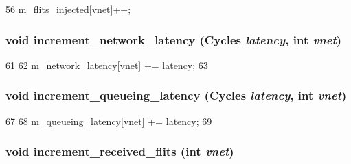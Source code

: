 \begin{DoxyCode}
56 { m_flits_injected[vnet]++; }
\end{DoxyCode}
\hypertarget{classBaseGarnetNetwork_a5fce9a1760010c8fdd6f09dea941b8ee}{
\subsubsection[{increment\_\-network\_\-latency}]{\setlength{\rightskip}{0pt plus 5cm}void increment\_\-network\_\-latency ({\bf Cycles} {\em latency}, \/  int {\em vnet})}}
\label{classBaseGarnetNetwork_a5fce9a1760010c8fdd6f09dea941b8ee}



\begin{DoxyCode}
61     {
62         m_network_latency[vnet] += latency;
63     }
\end{DoxyCode}
\hypertarget{classBaseGarnetNetwork_a9ecb65d46da0a615d77f2cbffe203304}{
\subsubsection[{increment\_\-queueing\_\-latency}]{\setlength{\rightskip}{0pt plus 5cm}void increment\_\-queueing\_\-latency ({\bf Cycles} {\em latency}, \/  int {\em vnet})}}
\label{classBaseGarnetNetwork_a9ecb65d46da0a615d77f2cbffe203304}



\begin{DoxyCode}
67     {
68         m_queueing_latency[vnet] += latency;
69     }
\end{DoxyCode}
\hypertarget{classBaseGarnetNetwork_a2afd334f1237424acf847d5ddb7a2a95}{
\subsubsection[{increment\_\-received\_\-flits}]{\setlength{\rightskip}{0pt plus 5cm}void increment\_\-received\_\-flits (int {\em vnet})}}
\label{classBaseGarnetNetwork_a2afd334f1237424acf847d5ddb7a2a95}




